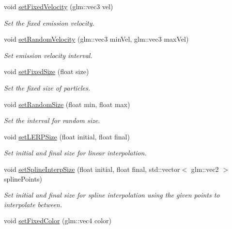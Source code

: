 \begin{DoxyCompactItemize}
void \hyperlink{struct_mason_1_1_particle_emitter_config_a63a5b2c01c1f4cc0eaa1e8d4b9226146}{set\+Fixed\+Velocity} (glm\+::vec3 vel)
\begin{DoxyCompactList}\small\item\em Set the fixed emission velocity. \end{DoxyCompactList}\item 
void \hyperlink{struct_mason_1_1_particle_emitter_config_a9102ce5287cd4c13e89f5e695563076f}{set\+Random\+Velocity} (glm\+::vec3 min\+Vel, glm\+::vec3 max\+Vel)
\begin{DoxyCompactList}\small\item\em Set emission velocity interval. \end{DoxyCompactList}\item 
void \hyperlink{struct_mason_1_1_particle_emitter_config_a52313455114fadb6609232719681b4d7}{set\+Fixed\+Size} (float size)
\begin{DoxyCompactList}\small\item\em Set the fixed size of particles. \end{DoxyCompactList}\item 
void \hyperlink{struct_mason_1_1_particle_emitter_config_ab644fd902c0e29f758a53912d0784f19}{set\+Random\+Size} (float min, float max)
\begin{DoxyCompactList}\small\item\em Set the interval for random size. \end{DoxyCompactList}\item 
void \hyperlink{struct_mason_1_1_particle_emitter_config_a5495ec9be73c80df30115461b6af7733}{set\+L\+E\+R\+P\+Size} (float initial, float final)
\begin{DoxyCompactList}\small\item\em Set initial and final size for linear interpolation. \end{DoxyCompactList}\item 
void \hyperlink{struct_mason_1_1_particle_emitter_config_a4288325ce9dcf3437fbcabaf99f968b4}{set\+Spline\+Interp\+Size} (float initial, float final, std\+::vector$<$ glm\+::vec2 $>$ spline\+Points)
\begin{DoxyCompactList}\small\item\em Set initial and final size for spline interpolation using the given points to interpolate between. \end{DoxyCompactList}\item 
void \hyperlink{struct_mason_1_1_particle_emitter_config_ae4aa09d5feb556808fba6c23167d9d78}{set\+Fixed\+Color} (glm\+::vec4 color)

\end{DoxyCompactItemize}
